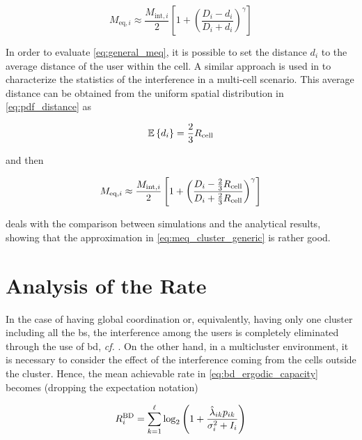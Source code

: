 \begin{equation} \label{eq:general_meq}
    M_{\text{eq}, i} \approx \frac{M_{\text{int}, i}}{2} \left[ 1 + \left(
    \frac{D_i - d_i}{D_i + d_i}\right)^\gamma\right]
\end{equation}

In order to evaluate \eqref{eq:general_meq}, it is possible to set the distance
$d_i$ to the average distance of the user within the cell. A similar approach is
used in \cite{pijcke11} to characterize the statistics of the interference in a
multi-cell scenario. This average distance can be obtained from the uniform
spatial distribution in \eqref{eq:pdf_distance} as

\begin{equation} \label{eq:average_distance}
    \mathbb{E}\left\{d_i\right\} = \frac{2}{3}R_{\text{cell}}
\end{equation}

\noindent
and then

\begin{equation} \label{eq:meq_cluster_generic}
    M_{\text{eq}, i} \approx \frac{M_{\text{int},i}}{2} \left[ 1 + \left(
        \frac{D_i - \frac{2}{3}R_{\text{cell}}}
        {D_i + \frac{2}{3}R_{\text{cell}}}\right)^\gamma\right]
\end{equation}

 deals with the comparison between simulations and
the analytical results, showing that the approximation in
\eqref{eq:meq_cluster_generic} is rather good.


\section{Analysis of the Rate}\label{sec:achiev_rate_analysis}

In the case of having global coordination or, equivalently, having only one
cluster including all the \gls{bs}, the interference among the users is
completely eliminated through the use of \gls{bd}, \emph{cf.} . On
the other hand, in a multicluster environment, it is necessary to consider the
effect of the interference coming from the cells outside the cluster. Hence, the
mean achievable rate in \eqref{eq:bd_ergodic_capacity} becomes (dropping the
expectation notation)

\begin{equation} \label{eq:rate_bd_interf}
    R_i^{\text{BD}} = \sum\limits_{k = 1}^{\ell} \log_2 \left(1 +
        \frac{\hat{\lambda}_{ik} p_{ik}}{\sigma_i^2 + I_i} \right)
\end{equation}

